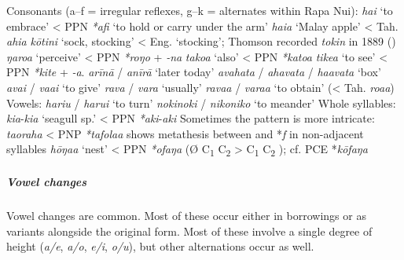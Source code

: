 \ea
Consonants (a–f = irregular reflexes, g–k = alternates within Rapa Nui): 
\ea
\textit{ha{\ꞌ}i} ‘to embrace’ {\textless} PPN \textit{*{\ꞌ}afi} ‘to hold or carry under the arm’
\ex
\textit{ha{\ꞌ}i{\ꞌ}a} ‘Malay apple’ {\textless} Tah. \textit{{\ꞌ}ahi{\ꞌ}a}
\ex
\textit{kōtini} ‘sock, stocking’ {\textless} Eng. ‘stocking’; Thomson recorded \textit{tokin} in 1889 (\citealt[157]{Thomson1980})
\ex
\textit{ŋaro{\ꞌ}a} ‘perceive’ {\textless} PPN \textit{*roŋo} + \textit{{}-na}
\ex
\textit{tako{\ꞌ}a} ‘also’ {\textless} PPN \textit{*katoa}
\ex
\textit{tike{\ꞌ}a} ‘to see’ {\textless} PPN \textit{*kite} + \textit{\nobreakdash-a}. 
\ex
\textit{{\ꞌ}arīnā} / \textit{{\ꞌ}anīrā} ‘later today’
\ex
\textit{{\ꞌ}avahata} / \textit{ahavata} / \textit{ha{\ꞌ}avata} ‘box’
\ex
\textit{{\ꞌ}avai} / \textit{va{\ꞌ}ai} ‘to give’
\ex
\textit{rava} / \textit{vara} ‘usually’
\ex
\textit{\mbox{rava{\ꞌ}a}} / \textit{vara{\ꞌ}a} ‘to obtain’ ({\textless} Tah. \textit{roa{\ꞌ}a})
\z
\z
\ea
Vowels: 
\ea
\textit{hariu} / \textit{harui} ‘to turn’
\ex
\textit{nokinoki} / \textit{nikoniko} ‘to meander’
\z
\z
\ea
Whole syllables: 
\ea
\textit{kia}{}-\textit{kia} ‘seagull sp.’ {\textless} PPN \textit{*}\textit{aki}{}-\textit{aki}
\z
\z
\ea
{}Sometimes the pattern is more intricate: 
\ea
\textit{ta{\ꞌ}oraha} {\textless} PNP \textit{*}\textit{tafola{\ꞌ}a} shows metathesis between \textit{{\ꞌ}} and *\textit{f} in non-adjacent syllables
\ex
\textit{hōŋa{\ꞌ}a} ‘nest’ {\textless} PPN \textit{*ofaŋa} (Ø C\textsubscript{1} C\textsubscript{2} > C\textsubscript{1} C\textsubscript{2} \textit{{\ꞌ}}); cf. PCE *\textit{kōfaŋa}
\z
\z
{}
\subparagraph{Vowel changes} Vowel changes are common. Most of these occur either in  borrowings or as variants alongside the original form. Most of these involve a single degree of height (\textit{a/e}, \textit{a/o}, \textit{e/i}, \textit{o/u}), but other alternations occur as well.

